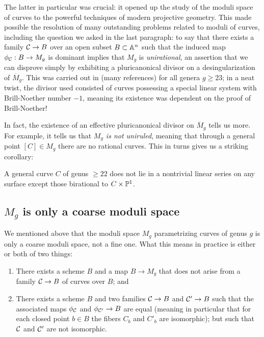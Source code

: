 The latter in particular was crucial: it opened up the study of the moduli space of curves to the powerful techniques of modern projective geometry. This made possible the resolution of many outstanding problems related to moduli of curves, including the question we asked in the last paragraph: to say that there exists a family $\cC \to B$ over an open subset $B \subset \AA^n$ such that the induced map $\phi_\cC : B \to M_g$ is dominant implies that $M_g$ is \emph{unirational}, an assertion that we can disprove simply by exhibiting a pluricanonical divisor on a desingularization of $\overline M_g$. This was carried out in (many references) for all genera $g \geq 23$; in a neat twist, the divisor used consisted of curves possessing a special linear system with Brill-Noether number $-1$, meaning its existence was dependent on the proof of Brill-Noether!

In fact, the existence of an effective pluricanonical divisor on $\overline M_g$ tells us more. For example, it tells us that \emph{$M_g$ is not uniruled}, meaning that through a general point $[C] \in M_g$ there are no rational curves. This in turns gives us a striking corollary:

\begin{corollary}
 A general curve $C$ of  genus $\geq 22$ does not lie in a nontrivial linear series on any surface
 except those birational to $C\times \PP^1$.
\end{corollary}



\subsection{$M_g$ is only a coarse moduli space}

We mentioned above that the moduli space $M_g$ parametrizing curves of genus $g$ is only a coarse moduli space, not a fine one. What this means in practice is either or both of two things:

\begin{enumerate}
\item There exists a scheme $B$ and a map $B \to M_g$ that does not arise from a family $\cC \to B$ of curves over $B$; and
\item There exists a scheme $B$ and two families $\cC \to B$ and $\cC' \to B$ such that the associated maps $\phi_\cC$ and $\phi_{\cC'} \to B$ are equal (meaning in particular that for each closed point $b \in B$ the fibers $C_b$ and $C'_b$ are isomorphic); but such that $\cC$ and $\cC'$ are not isomorphic.
\end{enumerate}

